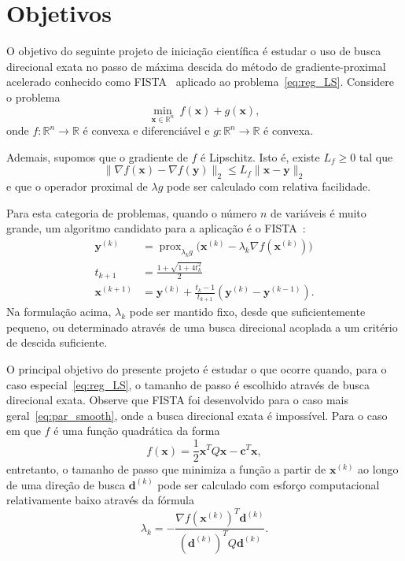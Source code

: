 \documentclass[12pt]{article}
\DeclareMathOperator{\prox}{prox}
\begin{document}
\section{Objetivos}

O objetivo do seguinte projeto de iniciação científica é estudar o uso de busca direcional exata no passo de máxima descida do método de gradiente-proximal acelerado conhecido como FISTA~\cite{bet09,bet09b} aplicado ao problema~\eqref{eq:reg_LS}. Considere o problema
\begin{equation}\label{eq:par_smooth}
    \min_{\bm x \in \mathbb R^n} \ f( \bm x ) + g( \bm x ),
\end{equation}
onde $f : \mathbb R^n \to \mathbb R$ é convexa e diferenciável e $g : \mathbb R^n \to \mathbb R$ é convexa.

Ademais, supomos que o gradiente de $f$ é Lipschitz. Isto é, existe $L_f \ge 0$ tal que
$$
    \| \nabla f( \bm x ) - \nabla f( \bm y ) \|_2 \le L_f\| \bm x - \bm y \|_2
$$
e que o operador proximal de $\lambda g$ pode ser calculado com relativa facilidade.

Para esta categoria de problemas, quando o número $n$ de variáveis é muito grande, um algoritmo candidato para a aplicação é o FISTA~\cite{bet09,bet09b}:
\begin{align*}
    \bm y^{( k )} &{}= \prox_{\lambda_k g}\bigl( \bm x^{( k )} - \lambda_k \nabla f( \bm x^{( k )} ) \bigr)\\
    t_{k + 1} &{}= \frac{1 + \sqrt{1 + 4t_k^2}}2\\
    \bm x^{( k + 1 )} &{}= \bm y^{( k )} + \frac{t_k - 1}{t_{k + 1}}( \bm y^{( k )} - \bm y^{( k - 1 )} ).
\end{align*}
Na formulação acima, $\lambda_k$ pode ser mantido fixo, desde que suficientemente pequeno, ou determinado através de uma busca direcional acoplada a um critério de descida suficiente.

O principal objetivo do presente projeto é estudar o que ocorre quando, para o caso especial~\eqref{eq:reg_LS}, o tamanho de passo é escolhido através de busca direcional exata. Observe que FISTA foi desenvolvido para o caso mais geral~\eqref{eq:par_smooth}, onde a busca direcional exata é impossível. Para o caso em que $f$ é uma função quadrática da forma
$$
    f( \bm x ) = \frac12\bm x^TQ\bm x - \bm c^T\bm x,
$$
entretanto, o tamanho de passo que minimiza a função a partir de $\bm x^{( k )}$ ao longo de uma direção de busca $\bm d^{( k )}$ pode ser calculado com esforço computacional relativamente baixo através da fórmula
$$
    \lambda_k = -\frac{\nabla f( \bm x^{( k )} )^T\bm d^{( k )}}{( \bm d^{( k )} )^TQ\bm d^{( k )}}.
$$
\end{document}

